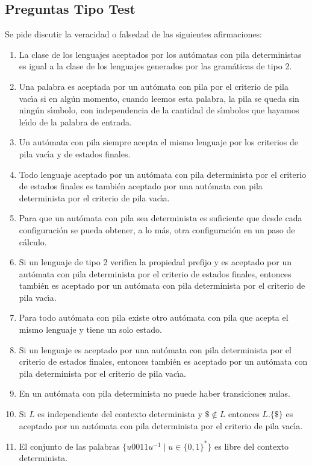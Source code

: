 \subsection{Preguntas Tipo Test}
Se pide discutir la veracidad o falsedad de las siguientes afirmaciones:
\begin{enumerate}
    \item La clase de los lenguajes aceptados por los autómatas con pila deterministas es igual a la clase de los lenguajes generados por las gramáticas de tipo 2.
    \item Una palabra es aceptada por un autómata con pila por el criterio de pila vacı́a si en algún momento, cuando leemos esta palabra, la pila se queda sin ningún sı́mbolo, con independencia de la cantidad de sı́mbolos que hayamos leı́do de la palabra de entrada.
    \item Un autómata con pila siempre acepta el mismo lenguaje por los criterios de pila vacı́a y de estados finales.
    \item Todo lenguaje aceptado por un autómata con pila determinista por el criterio de estados finales es también aceptado por una autómata con pila determinista por el criterio de pila vacı́a.
    \item Para que un autómata con pila sea determinista es suficiente que desde cada configuración se pueda obtener, a lo más, otra configuración en un paso de cálculo.
    \item Si un lenguaje de tipo 2 verifica la propiedad prefijo y es aceptado por un autómata con pila determinista por el criterio de estados finales, entonces también es aceptado por un autómata con pila determinista por el criterio de pila vacı́a.
    \item Para todo autómata con pila existe otro autómata con pila que acepta el mismo lenguaje y tiene un solo estado.
    \item Si un lenguaje es aceptado por una autómata con pila determinista por el criterio de estados finales, entonces también es aceptado por un autómata con pila determinista por el criterio de pila vacı́a.
    \item En un autómata con pila determinista no puede haber transiciones nulas.
    \item Si $L$ es independiente del contexto determinista y $\$ \notin L$ entonces $L.\{\$\}$ es aceptado por un autómata con pila determinista por el criterio de pila vacı́a.
    \item El conjunto de las palabras $\{u0011u^{-1}\mid u\in {\{0,1\}}^{\ast}\}$ es libre del contexto determinista.

\end{enumerate}
